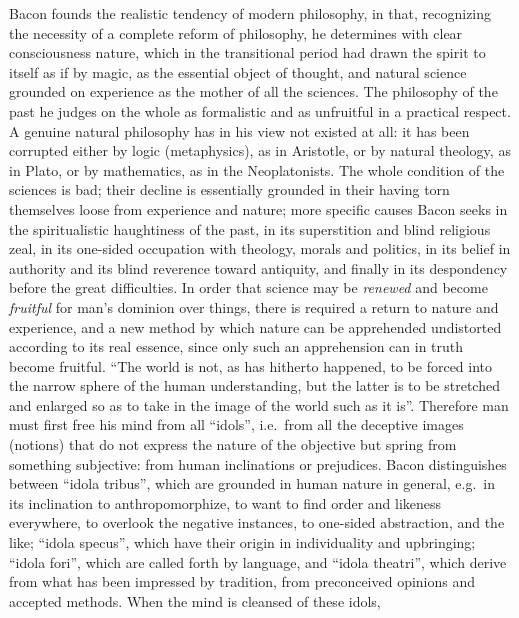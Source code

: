 \divrule

Bacon founds the realistic tendency of modern philosophy, in that, recognizing the necessity of a complete reform of philosophy, he determines with clear consciousness
nature, which in the transitional period had drawn the spirit to itself as if by magic,
as the essential object of thought, and natural science grounded on
experience as the mother of all the sciences.
The philosophy of the past he judges on the whole as formalistic
and as unfruitful in a practical respect. A genuine natural philosophy has in his view not existed at all: it has
been corrupted either by logic (metaphysics), as in Aristotle, or by natural theology, as in Plato, or
by mathematics, as in the Neoplatonists. The whole condition of the
sciences is bad; their decline is essentially grounded in
their having torn themselves loose from experience and nature; more specific causes
Bacon seeks in the spiritualistic haughtiness of the past, in its superstition and blind religious zeal, in its one-sided occupation with theology, morals and politics, in its
belief in authority and its blind reverence toward antiquity,
and finally in its despondency before the great difficulties.
In order that science may be \emph{renewed} and become \emph{fruitful} for
man's dominion over things, there is required a return to nature and experience, and a new method by
which nature can be apprehended undistorted according to its real
essence, since only such an apprehension can in truth become
fruitful. ``The world is not, as has hitherto happened, to be forced
into the narrow sphere of the human understanding, but the latter
is to be stretched and enlarged so as to take in the image of the world
such as it is''. Therefore man must first free his
mind from all ``idols'', i.e.\ from all the deceptive images (notions) that do not express the nature of the objective but spring from something subjective: from human inclinations or
prejudices. Bacon distinguishes between ``idola tribus'', which are
grounded in human nature in general, e.g.\ in
its inclination to anthropomorphize, to want to find
order and likeness everywhere, to overlook the negative instances,
to one-sided abstraction, and the like; ``idola specus'', which have their
origin in individuality and upbringing; ``idola fori'',
which are called forth by language, and ``idola theatri'', which derive
from what has been impressed by tradition, from preconceived opinions
and accepted methods. When the mind is cleansed of these idols,
